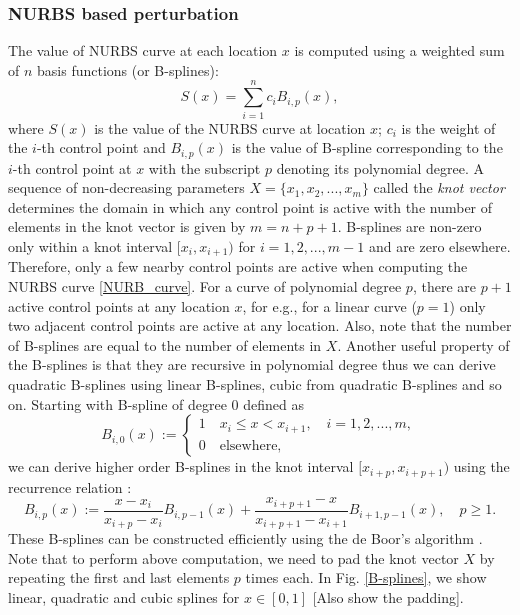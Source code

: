 \documentclass[review]{elsarticle}
\numberwithin{equation}{section}
\numberwithin{equation}{section}
\begin{document}
\subsubsection{NURBS based perturbation}
The value of NURBS curve at each location $x$ is computed using a weighted sum of $n$ basis functions (or B-splines):
\begin{equation}\label{NURB_curve}
S(x)  = \sum_{i=1}^{n} c_i B_{i,p}(x),
\end{equation}
where $S(x)$ is the value of the NURBS curve at location $x$; $c_i$ is the weight of the $i$-th control point and $B_{i,p}(x)$ is the value of B-spline corresponding to the $i$-th control point at $x$ with the subscript $p$ denoting its polynomial degree. A sequence of non-decreasing parameters $X = \{x_1,x_2,...,x_m\}$ called the \textit{knot vector} determines the domain in which any control point is active with the number of elements in the knot vector is given by $m = n+p+1$. B-splines are non-zero only within a knot interval $[x_i,x_{i+1})$ for $i = 1, 2, ..., m-1$ and are zero elsewhere. Therefore, only a few nearby control points are active when computing the NURBS curve \eqref{NURB_curve}. For a curve of polynomial degree $p$, there are $p+1$ active control points at any location $x$, for e.g., for a linear curve ($p=1$) only two adjacent control points are active at any location. Also, note that the number of B-splines are equal to the number of elements in $X$. Another useful property of the B-splines is that they are recursive in polynomial degree thus we can derive quadratic B-splines using linear B-splines, cubic from quadratic B-splines and so on. Starting with B-spline of degree 0 defined as 
\begin{equation}\label{linearBspline}
B_{i,0}(x) :=
\begin{cases}
1\quad x_i\leq x < x_{i+1},\quad i = 1,2,...,m,\\
0\quad\text{elsewhere,}
\end{cases} 
\end{equation}
we can derive higher order B-splines in the knot interval $[x_{i+p},x_{i+p+1})$ using the recurrence relation \cite{deBoor}:
\begin{equation}\label{NURBS_recurrence}
B_{i,p}(x) := \frac{x - x_i}{x_{i+p} - x_i}B_{i,p-1}(x) + \frac{x_{i+p+1}  -  x}{x_{i+p+1}  -  x_{i+1}}B_{i+1,p-1}(x),\quad p\geq1.
\end{equation} 
These B-splines can be constructed efficiently using the de Boor's algorithm \cite{deBoor}. Note that to perform above computation, we need to pad the knot vector $X$ by repeating the first and last elements $p$ times each. In Fig. \ref{B-splines}, we show linear, quadratic and cubic splines for $x\in[0,1]$ [Also show the padding]. 
\end{document}

